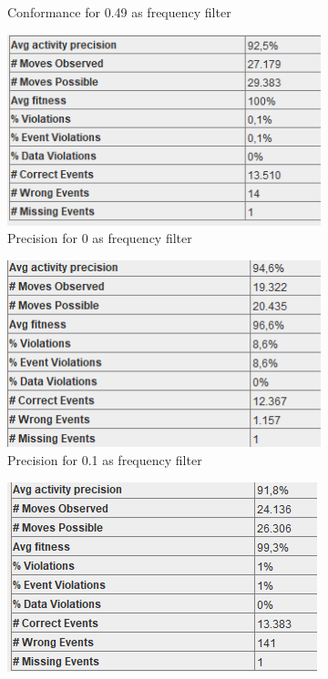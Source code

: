\begin{figure}[!htbp]
\begin{subfigure}{.3\textwidth}
  \caption{Conformance for 0.49 as frequency filter}
  \label{fig:CancCon0-2}
\end{subfigure}
\begin{subfigure}{.3\textwidth}
  \centering
  \includegraphics[width=\linewidth]{CancPrec0.PNG}
  \caption{Precision for 0 as frequency filter}
  \label{fig:CancPrec0}
\end{subfigure}%
\begin{subfigure}{.3\textwidth}
  \centering
  \includegraphics[width=\linewidth]{CancPrec0-1.PNG}
  \caption{Precision for 0.1 as frequency filter}
  \label{fig:CancPrec0-1}
\end{subfigure}
\begin{subfigure}{.3\textwidth}
  \centering
  \includegraphics[width=\linewidth]{CancPrec0-49.PNG}

\end{subfigure}
\end{figure}

